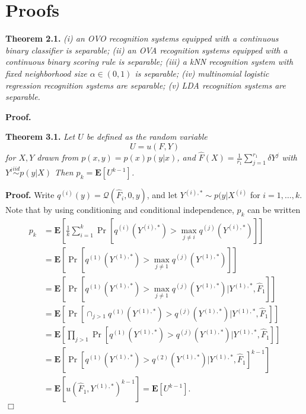\documentclass[12pt]{article}
\begin{document}
\maketitle

\newcommand{\tr}{\text{tr}}
\newcommand{\E}{\textbf{E}}
\newcommand{\diag}{\text{diag}}
\newcommand{\argmax}{\text{argmax}}
\newcommand{\Cov}{\text{Cov}}
\newcommand{\Var}{\text{Var}}
\newcommand{\argmin}{\text{argmin}}
\newcommand{\Vol}{\text{Vol}}
\newcommand{\comm}[1]{}
\newcommand{\indep}{\rotatebox[origin=c]{90}{$\models$}}
\newcommand{\Cor}{\text{Cor}}

\section{Proofs}

\textbf{Theorem 2.1.} \emph{(i) an OVO recognition systems equipped with a continuous binary classifier is separable; (ii) an OVA recognition systems equipped with a continuous binary scoring rule is separable;
(iii) a kNN recognition system with fixed neighborhood size $\alpha \in (0, 1)$ is separable; (iv) multinomial logistic regression recognition systems are separable; (v) LDA recognition systems are separable.}

\noindent\textbf{Proof.}  \newline

\noindent\textbf{Theorem 3.1.} \emph{
Let $U$ be defined as the random variable
\[U = u(F, Y)\]
for $X, Y$ drawn from $p(x, y) = p(x) p(y|x)$,
and $\hat{F}(X) = \frac{1}{r_1}\sum_{j=1}^{r_1} \delta{Y^j}$ with $Y^i \stackrel{iid}{\sim} p(y|X)$
Then $p_k = \E[U^{k-1}]$.
}

\noindent\textbf{Proof.}  
Write $q^{(i)}(y) = \mathcal{Q}(\hat{F}_i, 0, y)$, and let $Y^{(i), *} \sim p(y|X^{(i)}$ for $i = 1,\hdots, k$.
Note that by using conditioning and
conditional independence, $p_k$ can be written
\begin{align*}
p_k &= \E\left[ \frac{1}{k}\sum_{i=1}^k  \Pr[q^{(i)}(Y^{(i), *}) > \max_{j\neq i} q^{(j)}(Y^{(i), *})] \right]
\\&= \E\left[ \Pr[q^{(1)}(Y^{(1), *}) > \max_{j\neq 1} q^{(j)}(Y^{(1), *})] \right]
\\&= \E[\Pr[q^{(1)}(Y^{(1), *}) > \max_{j\neq 1} q^{(j)}(Y^{(1), *})|Y^{(1), *}, \hat{F}_1]]
\\&= \E[\Pr[\cap_{j > 1} q^{(1)}(Y^{(1), *}) > q^{(j)}(Y^{(1), *})|Y^{(1), *}, \hat{F}_1]]
\\&= \E[\prod_{j > 1}\Pr[q^{(1)}(Y^{(1), *}) > q^{(j)}(Y^{(1), *})|Y^{(1), *}, \hat{F}_1]]
\\&= \E[\Pr[q^{(1)}(Y^{(1), *}) > q^{(2)}(Y^{(1), *})|Y^{(1), *}, \hat{F}_1]^{k-1}]
\\&= \E[u(\hat{F}_1, Y^{(1), *})^{k-1}] = \E[U^{k-1}].
\end{align*}
$\Box$\newline
\end{document}
